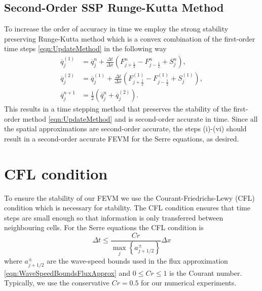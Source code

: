 \subsection{Second-Order SSP Runge-Kutta Method}
To increase the order of accuracy in time we employ the strong stability preserving Runge-Kutta method \cite{Gottlieb-etal-2003-89} which is a convex combination of the first-order time steps \eqref{eqn:UpdateMethod} in the following way
\begin{subequations}
\begin{align}
\overline{q}_j^{(1)} &= \overline{q}^{n}_j + \frac{\Delta t}{\Delta x} \left(F^n_{j+\frac{1}{2}} - F^n_{j-\frac{1}{2}} + S^n_j\right),\\
\overline{q}_j^{(2)} &= \overline{q}_j^{(1)} + \frac{\Delta t}{\Delta x} \left(F_{j+\frac{1}{2}}^{(1)} - F_{j-\frac{1}{2}}^{(1)}  + S_j^{(1)} \right), \\
\overline{q}^{n+1}_j &= \frac{1}{2} \left( \overline{q}^n_j +  \overline{q}_j^{(2)}  \right).
\end{align}
\label{eqn:SSPRKStep1}
\end{subequations}
This results in a time stepping method that preserves the stability of the first-order method \eqref{eqn:UpdateMethod} and is second-order accurate in time. Since all the spatial approximations are second-order accurate, the steps (i)-(vi) should result in a second-order accurate FEVM for the Serre equations, as desired. 


\section{CFL condition}
To ensure the stability of our FEVM we use the Courant-Friedrichs-Lewy (CFL) condition \cite{Courant-etal-1967-215} which is necessary for stability. The CFL condition ensures that time steps are small enough so that information is only transferred between neighbouring cells. For the Serre equations the CFL condition is 
\begin{equation}
\Delta t \le \frac{Cr }{\max_{j} \left\lbrace a^\pm_{j+1/2} \right\rbrace} \Delta x
\label{eqn:CFLcond}
\end{equation}
where $a^\pm_{j+1/2} $ are the wave-speed bounds used in the flux approximation \eqref{eqn:WaveSpeedBoundsFluxApprox} and $0\le Cr \le 1$ is the Courant number. Typically, we use the conservative $Cr = 0.5$ for our numerical experiments. 

